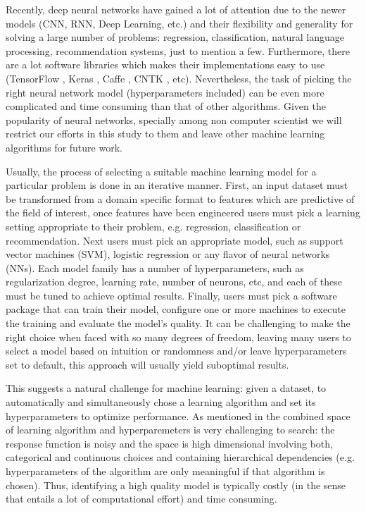 \documentclass[journal]{IEEEtran}
\begin{document}
Recently, deep neural networks have gained a lot of attention due to the newer models (CNN, RNN, Deep Learning, etc.) and their flexibility and generality for solving a large number of problems: regression, classification, natural language processing, recommendation systems, just to mention a few. Furthermore, there are a lot software libraries which makes their implementations easy to use (TensorFlow \cite{TensorFlow2015}, Keras \cite{keras2015}, Caffe \cite{caffe2014}, CNTK \cite{cntk2016}, etc). Nevertheless, the task of picking the right neural network model (hyperparameters included) can be even more complicated and time consuming than that of other algorithms. Given the popularity of neural networks, specially among non computer scientist we will restrict our efforts in this study to them and leave other machine learning algorithms for future work.

Usually, the process of selecting a suitable machine learning model for a particular problem is done in an iterative manner. First, an input dataset must be transformed from a domain specific format to features which are predictive of the field of interest, once features have been engineered users must pick a learning setting appropriate to their problem, e.g. regression, classification or recommendation. Next users must pick an appropriate model, such as support vector machines (SVM), logistic regression or any flavor of neural networks (NNs). Each model family has a number of hyperparameters, such as regularization degree, learning rate, number of neurons, etc, and each of these must be tuned to achieve optimal results. Finally, users must pick a software package that can train their model, configure one or more machines to execute the training and evaluate the model's quality. It can be challenging to make the right choice when faced with so many degrees of freedom, leaving many users to select a model based on intuition or randomness and/or leave hyperparameters set to default, this approach will usually yield suboptimal results.

This suggests a natural challenge for machine learning: given a dataset, to automatically and simultaneously chose a learning algorithm and set its hyperparameters to optimize performance. As mentioned in \cite{Hall2009} the combined space of learning algorithm and hyperparemeters is very challenging to search: the response function is noisy and the space is high dimensional involving both, categorical and continuous choices and containing hierarchical dependencies (e.g. hyperparameters of the algorithm are only meaningful if that algorithm is chosen). Thus, identifying a high quality model is typically costly (in the sense that entails a lot of computational effort) and time consuming.
\end{document}
